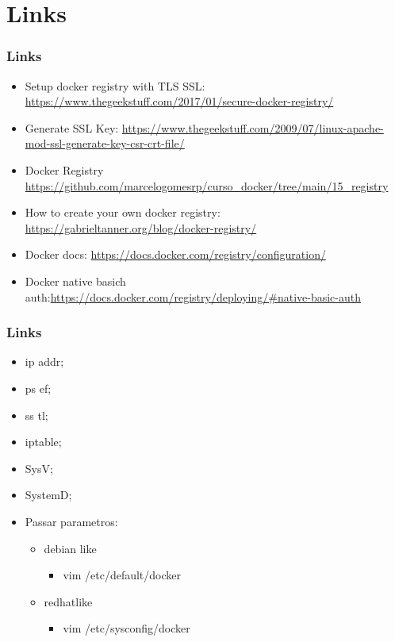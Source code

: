 \section{Links}

\begin{frame}[t]
	\frametitle{Links}
	\begin{itemize}
		\item Setup docker registry with TLS SSL: \url{https://www.thegeekstuff.com/2017/01/secure-docker-registry/}
		\item Generate SSL Key: \url{https://www.thegeekstuff.com/2009/07/linux-apache-mod-ssl-generate-key-csr-crt-file/}
		\item Docker Registry \url{https://github.com/marcelogomesrp/curso_docker/tree/main/15_registry}
		\item How to create your own docker registry: \url{https://gabrieltanner.org/blog/docker-registry/}
		\item Docker docs: \url{https://docs.docker.com/registry/configuration/}
		\item Docker native basich auth:\url{https://docs.docker.com/registry/deploying/\#native-basic-auth}
	\end{itemize}
\end{frame}

\begin{frame}[t]
	\frametitle{Links}
	\begin{itemize}
		\item ip addr;
		\item ps ef;
		\item ss tl;
		\item iptable;
		\item SysV;
		\item SystemD;
		\item Passar parametros:
			\begin{itemize}
				\item debian like
					\begin{itemize}
						\item vim /etc/default/docker
					\end{itemize}
				\item redhatlike
					\begin{itemize}
						\item vim /etc/sysconfig/docker
					\end{itemize}
			\end{itemize}
	\end{itemize}
\end{frame}
